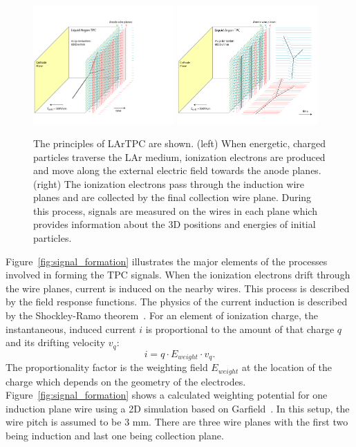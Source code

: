 \begin{figure}[htb]
\centering
\includegraphics[width=0.48\textwidth]{figures/TPC_1.png}
\includegraphics[width=0.48\textwidth]{figures/TPC_2.png}
\caption{The principles of LArTPC are shown. (left) When energetic, charged particles 
traverse the LAr medium, ionization electrons are produced and move
along the external electric field towards the anode planes. (right) The ionization
electrons pass through the induction wire planes and are  collected by the 
final collection wire plane. 
During this process, signals are measured on the wires
in each plane which provides information about the 3D positions and
energies of initial particles.}
\label{fig:signal}
\end{figure}

Figure~\ref{fig:signal_formation} illustrates the major elements of the  
processes involved in forming the TPC signals. 
When the ionization electrons drift through the wire planes, current is 
induced on the nearby wires. This process is described by the field response
functions. The physics of the current induction is described by the Shockley-Ramo 
theorem~\cite{Shockley,Ramo}.  For an element of ionization charge, 
the instantaneous, induced current $i$ is proportional to the amount of that
charge $q$ and its drifting velocity $v_q$:
\begin{equation}
i = q \cdot E_{weight} \cdot v_q.
\end{equation}
The proportionality factor is the weighting field $E_{weight}$ at the 
location of the charge which 
depends on the geometry of the electrodes. Figure~\ref{fig:signal_formation} shows a 
calculated weighting potential for one induction plane wire using a 2D simulation based 
on Garfield~\cite{garfield}. 
In this setup, the wire pitch is assumed to be 3 mm. There are three wire planes 
with the first two being induction and last one being collection plane. 

